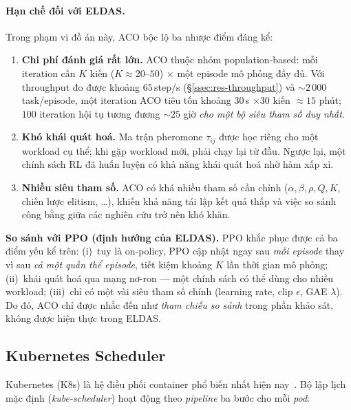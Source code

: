 \paragraph{Hạn chế đối với ELDAS.} Trong phạm vi đồ án này, ACO bộc lộ
ba nhược điểm đáng kể:
\begin{enumerate}
  \item \textbf{Chi phí đánh giá rất lớn.} ACO thuộc nhóm
        population-based: mỗi iteration cần $K$ kiến
        ($K \approx 20$--$50$) $\times$ một episode mô phỏng đầy đủ.
        Với throughput đo được khoảng $65$\,step/s
        (§\ref{ssec:res-throughput}) và $\sim 2\,000$ task/episode,
        một iteration ACO tiêu tốn khoảng $30$\,s $\times 30$ kiến
        $\approx 15$ phút; $100$ iteration hội tụ tương đương
        $\sim 25$ giờ \emph{cho một bộ siêu tham số duy nhất}.
  \item \textbf{Khó khái quát hoá.} Ma trận pheromone $\tau_{ij}$ được
        học riêng cho một workload cụ thể; khi gặp workload mới, phải
        chạy lại từ đầu. Ngược lại, một chính sách RL đã huấn luyện
        có khả năng khái quát hoá nhờ hàm xấp xỉ.
  \item \textbf{Nhiều siêu tham số.} ACO có khá nhiều tham số cần
        chỉnh ($\alpha, \beta, \rho, Q, K$, chiến lược elitism, \dots),
        khiến khả năng tái lập kết quả thấp và việc so sánh công bằng
        giữa các nghiên cứu trở nên khó khăn.
\end{enumerate}

\textbf{So sánh với PPO (định hướng của ELDAS).} PPO khắc phục được cả
ba điểm yếu kể trên: (i)~tuy là on-policy, PPO cập nhật ngay sau
\emph{mỗi episode} thay vì sau \emph{cả một quần thể episode}, tiết
kiệm khoảng $K$ lần thời gian mô phỏng; (ii)~khái quát hoá qua mạng
nơ-ron --- một chính sách có thể dùng cho nhiều workload; (iii)~chỉ có
một vài siêu tham số chính (learning rate, clip $\epsilon$, GAE
$\lambda$). Do đó, ACO chỉ được nhắc đến như \emph{tham chiếu so sánh}
trong phần khảo sát, không được hiện thực trong ELDAS.

\subsection{Kubernetes Scheduler}
Kubernetes (K8s) là hệ điều phối container phổ biến nhất hiện
nay~\cite{kubernetes2024scheduler}. Bộ lập lịch mặc định
(\textit{kube-scheduler}) hoạt động theo \textit{pipeline} ba bước cho mỗi
\textit{pod}:

